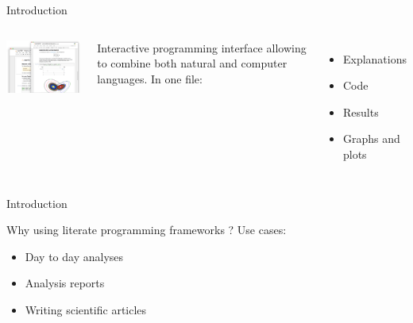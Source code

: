 \begin{frame}{Introduction}
\begin{columns}

\centering\includegraphics[width=6cm]{07_notebook/images/literate_programming.png}

Interactive programming interface allowing to combine both natural and computer languages.
\newline
\newline
In one file:
\begin{itemize}
  \item Explanations
  \item Code
  \item Results
  \item Graphs and plots
\end{itemize}

\end{columns}
\end{frame}

\begin{frame}{Introduction}

Why using literate programming frameworks ?\newline
\newline
Use cases:
\begin{itemize}
  \item Day to day analyses
  \item Analysis reports
  \item Writing scientific articles
\end{itemize}

\end{frame}

